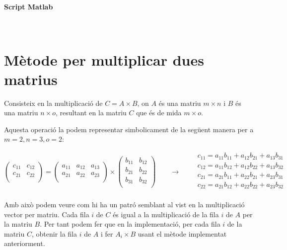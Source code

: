 \documentclass[11pt,a4paper,twoside]{report}
\begin{document}
\paragraph*{Script Matlab} \mbox{} \\



\section{Mètode per multiplicar dues matrius}

Consisteix en la multiplicació de $C = A \times B$, on $A$ és una matriu $m \times n$ i $B$ és una matriu $n \times o$, resultant en la matriu $C$ que és de mida $m \times o$. 

Aquesta operació la podem representar simbolicament de la següent manera per a $m = 2, n = 3, o = 2$: 

\[
\begin{pmatrix}
		  	c_{11}	&	c_{12}	\\
		  	c_{21}	&	c_{22}	\\
\end{pmatrix} = 
\begin{pmatrix}
		  	a_{11}	&	a_{12} & a_{13}\\
		  	a_{21}	&	a_{22} & a_{23}\\
\end{pmatrix} \times
\begin{pmatrix}
		  	b_{11}	&	b_{12}	\\
		  	b_{21}	&	b_{22}	\\
		  	b_{31}	&	b_{32}	\\
\end{pmatrix} \qquad \longrightarrow \qquad
\begin{matrix} 
c_{11} = a_{11}b_{11} + a_{12}b_{21} + a_{13}b_{31} \\
c_{12} = a_{11}b_{12} + a_{12}b_{22} + a_{13}b_{32} \\
c_{21} = a_{21}b_{11} + a_{22}b_{21} + a_{23}b_{31}	\\
c_{22} = a_{21}b_{12} + a_{22}b_{22} + a_{23}b_{32} \\
\end{matrix}
\]

Amb això podem veure com hi ha un patró semblant al vist en la multiplicació vector per matriu. Cada fila $i$ de $C$ és igual a la multiplicació de la fila $i$ de $A$ per la matriu $B$. Per tant podem fer que en la implementació, per cada fila $i$ de la matriu $C$, obtenir la fila $i$ de $A$ i fer $A_i \times B$ usant el mètode implementat anteriorment.
\end{document}
